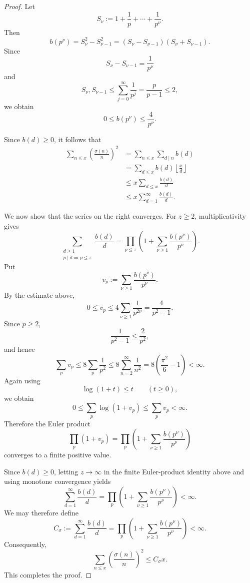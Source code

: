 \documentclass[10pt,a4paper]{amsart}
\begin{document}
\begin{proof}
Let
\[
S_\nu:=1+\frac1p+\cdots+\frac1{p^\nu}.
\]
Then
\[
b(p^\nu)
=
S_\nu^2-S_{\nu-1}^2
=
(S_\nu-S_{\nu-1})(S_\nu+S_{\nu-1}).
\]
Since
\[
S_\nu-S_{\nu-1}=\frac1{p^\nu}
\]
and
\[
S_\nu,S_{\nu-1}
\leq
\sum_{j=0}^{\infty}\frac1{p^j}
=
\frac{p}{p-1}
\leq2,
\]
we obtain
\[
0\leq b(p^\nu)\leq\frac4{p^\nu}.
\]

Since \(b(d)\geq0\), it follows that
\[
\begin{aligned}
\sum_{n\leq x}\left(\frac{\sigma(n)}{n}\right)^2
&=
\sum_{n\leq x}\sum_{d\mid n}b(d)\\
&=
\sum_{d\leq x}b(d)
\left\lfloor\frac{x}{d}\right\rfloor\\
&\leq
x\sum_{d\leq x}\frac{b(d)}{d}\\
&\leq
x\sum_{d=1}^{\infty}\frac{b(d)}{d}.
\end{aligned}
\]

We now show that the series on the right converges. For \(z\geq2\),
multiplicativity gives
\[
\sum_{\substack{d\geq1\\ p\mid d\Rightarrow p\leq z}}
\frac{b(d)}{d}
=
\prod_{p\leq z}
\left(
1+\sum_{\nu\geq1}\frac{b(p^\nu)}{p^\nu}
\right).
\]
Put
\[
v_p:=
\sum_{\nu\geq1}\frac{b(p^\nu)}{p^\nu}.
\]
By the estimate above,
\[
0\leq v_p
\leq
4\sum_{\nu\geq1}\frac1{p^{2\nu}}
=
\frac4{p^2-1}.
\]
Since \(p\geq2\),
\[
\frac1{p^2-1}\leq\frac2{p^2},
\]
and hence
\[
\sum_pv_p
\leq
8\sum_p\frac1{p^2}
\leq
8\sum_{n=2}^{\infty}\frac1{n^2}
=
8\left(\frac{\pi^2}{6}-1\right)
<
\infty.
\]
Again using
\[
\log(1+t)\leq t
\qquad(t\geq0),
\]
we obtain
\[
0\leq
\sum_p\log(1+v_p)
\leq
\sum_pv_p
<
\infty.
\]
Therefore the Euler product
\[
\prod_p(1+v_p)
=
\prod_p
\left(
1+\sum_{\nu\geq1}\frac{b(p^\nu)}{p^\nu}
\right)
\]
converges to a finite positive value.

Since \(b(d)\geq0\), letting \(z\to\infty\) in the finite Euler-product
identity above and using monotone convergence yields
\[
\sum_{d=1}^{\infty}\frac{b(d)}{d}
=
\prod_p
\left(
1+\sum_{\nu\geq1}\frac{b(p^\nu)}{p^\nu}
\right)
<\infty.
\]
We may therefore define
\[
C_\sigma
:=
\sum_{d=1}^{\infty}\frac{b(d)}{d}
=
\prod_p
\left(
1+\sum_{\nu\geq1}\frac{b(p^\nu)}{p^\nu}
\right)
<\infty.
\]
Consequently,
\[
\sum_{n\leq x}
\left(\frac{\sigma(n)}{n}\right)^2
\leq C_\sigma x.
\]
This completes the proof.
\end{proof}
\end{document}
